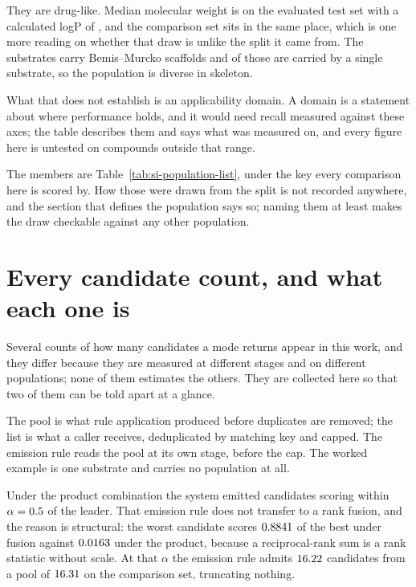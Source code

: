 \documentclass[journal=jcisd8,manuscript=suppinfo,layout=onecolumn]{achemso}
\begin{document}
They are drug-like. Median molecular weight is \numAdomainEvalMw{} on the evaluated test set with
a calculated logP of \numAdomainEvalLogp{}, and the comparison set sits in the same place, which
is one more reading on whether that draw is unlike the split it came from. The
\numPopulationTestsubs{} substrates carry \numAdomainEvalScaffolds{} Bemis--Murcko scaffolds and
\numAdomainEvalSingletons{} of those are carried by a single substrate, so the population is
diverse in skeleton.

What that does not establish is an applicability domain. A domain is a statement about where
performance holds, and it would need recall measured against these axes; the table describes them
and says what was measured on, and every figure here is untested on compounds outside
that range.



The members are Table~\ref{tab:si-population-list}, under the key every comparison here is
scored by. How those \numPopulationN{} were drawn from the split is not recorded anywhere, and
the section that defines the population says so; naming them at least makes the draw checkable
against any other population.





\section{Every candidate count, and what each one is}
\label{sec:si-counts}

Several counts of how many candidates a mode returns appear in this work, and they differ because
they are measured at different stages and on different populations; none of them estimates the
others. They are collected here so that two of them can be told apart at a glance.



The pool is what rule application produced before duplicates are removed; the list is what a caller
receives, deduplicated by matching key and capped. The emission rule reads the pool at its own
stage, before the cap. The worked example is one substrate and carries no population at all.


Under the product combination the system emitted candidates scoring within $\alpha =
0.5$ of the leader. That emission rule does not transfer to a rank fusion, and the reason
is
structural: the worst candidate scores $0.8841$ of the best under fusion against
$0.0163$ under the product, because a reciprocal-rank sum is a rank statistic
without scale. At that $\alpha$ the emission rule admits $16.22$ candidates from a pool
of
$16.31$ on the comparison set, truncating nothing.
\end{document}
